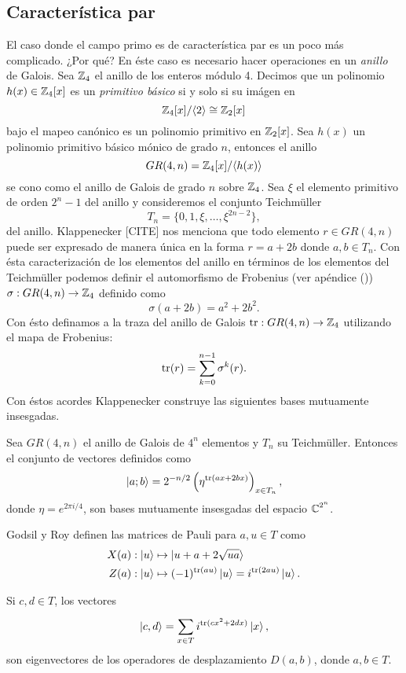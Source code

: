   \subsection{Característica par}

  El caso donde el campo primo es de característica par es
  un poco más complicado. ¿Por qué? En éste caso es
  necesario hacer operaciones en un \textit{anillo} de
  Galois. Sea $\operatorname{\mathbb{Z}}_4$ el anillo de los enteros módulo 4.
  Decimos que un polinomio $h(x) \in \operatorname{\mathbb{Z}}_4[x]$ es un
  \textit{primitivo básico} si y solo si su imágen en
  \[
    \operatorname{\mathbb{Z}}_4[x] / \langle 2 \rangle
    \cong
    \operatorname{\mathbb{Z}}_2[x]
  \] 
  bajo el mapeo canónico es un polinomio primitivo en
  $\operatorname{\mathbb{Z}}_2[x]$. Sea $h(x)$ un polinomio primitivo básico mónico
  de grado $n$, entonces el anillo
  \begin{equation}
    GR(4,n)
    = \operatorname{\mathbb{Z}}_4[x] / \langle h(x) \rangle    
  \end{equation}
  se cono como el anillo de Galois de grado $n$ sobre
  $\operatorname{\mathbb{Z}}_4$.
  Sea $\xi$ el elemento primitivo de orden $2^{n}-1$ del
  anillo y consideremos el conjunto Teichmüller
  \[
    T_n
    = \{0,1,\xi,\ldots,\xi^{2n-2}\},
  \] 
  del anillo. Klappenecker [CITE] nos menciona que todo
  elemento $r \in GR(4,n)$ puede ser expresado de manera
  única en la forma $r = a + 2b$ donde $a,b \in T_n$. Con
  ésta caracterización de los elementos del anillo en
  términos de los elementos del Teichmüller podemos definir
  el automorfismo de Frobenius (ver apéndice ()) $\sigma :
  GR(4,n) \to \operatorname{\mathbb{Z}}_4$ definido como
  \[
    \sigma(a+2b)
    = a^2+2b^2.
  \] 
  Con ésto definamos a la traza del anillo de Galois $\operatorname{tr} :
  GR(4,n) \to \operatorname{\mathbb{Z}}_4$ utilizando el mapa de Frobenius:
  \[
    \operatorname{tr}(r)
    = \sum_{k=0}^{n-1} \sigma^{k}(r).
  \] 
  Con éstos acordes Klappenecker construye las siguientes
  bases mutuamente insesgadas.
  \begin{proposition}
    Sea $GR(4,n)$ el anillo de Galois de $4^{n}$ elementos y
    $T_n$ su Teichmüller. Entonces el conjunto de vectores
    definidos como
    \begin{equation}
      \ket{a; b}
      = 2^{-n / 2} \left(
        \eta^{\operatorname{tr}\left( ax + 2bx \right)}
      \right)_{x \in T_n},
    \end{equation}
    donde $\eta = e^{2\pi i / 4}$, son bases mutuamente
    insesgadas del espacio $\operatorname{\mathbb{C}}^{2^{n}}$.
  \end{proposition}

  Godsil y Roy definen las matrices de Pauli para $a, u \in
  T$ como
  \begin{align}
    X(a) &: \ket u \mapsto \ket{u+a+2 \sqrt{ua}} \\
    Z(a) &: \ket u \mapsto (-1)^{\operatorname{tr}(au)} \ket{u}
    = i^{\operatorname{tr}(2au)}\ket u.
  \end{align}
  \begin{proposition}
    Si $c,d \in T$, los vectores
    \begin{equation}
      \ket{c,d}
      = \sum_{x \in T}^{} i^{\operatorname{tr}(cx^2+2dx)} \ket x,
    \end{equation}
    son eigenvectores de los operadores de desplazamiento
    $D(a,b)$, donde $a,b \in T$.
  \end{proposition}

